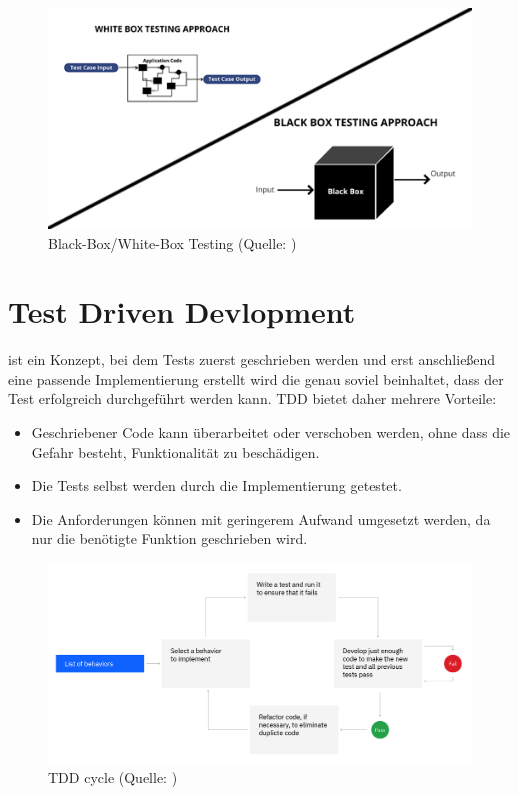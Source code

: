 \documentclass[a4paper, fontsize=11pt, parskip=half, twoside]{scrreprt}
\begin{document}
	\begin{figure}[H]
		\centering
		\includegraphics[scale=0.6]{assets/WhiteBoxBlackBoxTesting.jpg}
		\caption{Black-Box/White-Box Testing (Quelle: \textcite{khandelwal_difference_2019})}
		\label{fig:WhiteBoxBlackBoxTesting}
	\end{figure}
	
	
	\section{Test Driven Devlopment}
	 ist ein Konzept, bei dem Tests zuerst geschrieben werden und erst anschließend eine passende Implementierung erstellt wird die genau soviel beinhaltet, dass der Test erfolgreich durchgeführt werden kann.
	\ac{TDD} bietet daher mehrere Vorteile:
	
	\begin{itemize}
		\item Geschriebener Code kann überarbeitet oder verschoben werden, ohne dass die Gefahr besteht, Funktionalität zu beschädigen.
		\item Die Tests selbst werden durch die Implementierung getestet.
		\item Die Anforderungen können mit geringerem Aufwand umgesetzt werden, da nur die benötigte Funktion geschrieben wird.
	\end{itemize}

	\textcite{ammann_introduction_2016}
	
	\begin{figure}[H]
		\centering
		\includegraphics[scale=0.25]{assets/tdd-cycle.png}
		\caption{\acl{TDD} cycle (Quelle: \textcite{noauthor_test-driven_nodate})}
		\label{fig:tdd-cycle}
	\end{figure}
	
\end{document}
